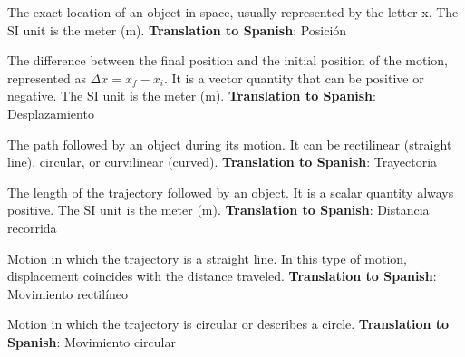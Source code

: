 \begin{vocabulary}[Position]
The exact location of an object in space, usually represented by the letter x. The SI unit is the meter (m). \newline
\textbf{Translation to Spanish}: Posición \newline
\end{vocabulary}

\begin{vocabulary}[Displacement]
The difference between the final position and the initial position of the motion, represented as \( \Delta x = x_f - x_i \). It is a vector quantity that can be positive or negative. The SI unit is the meter (m). \newline
\textbf{Translation to Spanish}: Desplazamiento \newline
\end{vocabulary}

\begin{vocabulary}[Trajectory]
The path followed by an object during its motion. It can be rectilinear (straight line), circular, or curvilinear (curved). \newline
\textbf{Translation to Spanish}: Trayectoria \newline
\end{vocabulary}

\begin{vocabulary}
The length of the trajectory followed by an object. It is a scalar quantity always positive. The SI unit is the meter (m). \newline
\textbf{Translation to Spanish}: Distancia recorrida \newline
\end{vocabulary}

\begin{vocabulary}
Motion in which the trajectory is a straight line. In this type of motion, displacement coincides with the distance traveled. \newline
\textbf{Translation to Spanish}: Movimiento rectilíneo \newline
\end{vocabulary}

\begin{vocabulary}
Motion in which the trajectory is circular or describes a circle. \newline
\textbf{Translation to Spanish}: Movimiento circular \newline
\end{vocabulary}

